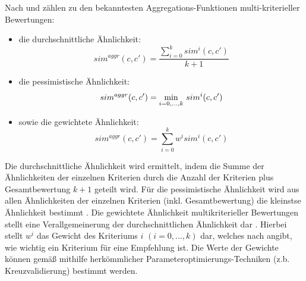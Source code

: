 Nach \textcite[S. 427]{recommenderSystems:2016} und \textcite[S. 857]{adomavicius:4:inbook} zählen zu den bekanntesten Aggregations-Funktionen multi-kriterieller Bewertungen:
\begin{itemize}
    \item die durchschnittliche Ähnlichkeit:
    \begin{equation}\label{eq15}
        sim^{aggr}(c,c') = \frac{\sum\limits_{i=0}^{k}sim^{i}(c,c')}{k+1}
    \end{equation}
    \item die pessimistische Ähnlichkeit:
    \begin{equation}\label{eq16}
        sim^{aggr}(c,c') = \underset{i=0,...,k}{\min}\textnormal{ }sim^{i}(c,c')
    \end{equation}
    \item sowie die gewichtete Ähnlichkeit:
    \begin{equation}\label{eq17}
        sim^{aggr}(c,c') = \sum\limits_{i=0}^{k}w^{i}sim^{i}(c,c')
    \end{equation}
\end{itemize}

Die durchschnittliche Ähnlichkeit wird ermittelt, indem die Summe der Ähnlichkeiten der einzelnen Kriterien durch die Anzahl der Kriterien plus Gesamtbewertung $k+1$ geteilt wird.
Für die pessimistische Ähnlichkeit wird aus allen Ähnlichkeiten der einzelnen Kriterien (inkl. Gesamtbewertung) die kleinstse Ähnlichkeit bestimmt \cite[S. 427]{recommenderSystems:2016}.
Die gewichtete Ähnlichkeit multikriterieller Bewertungen \cite[Kapitel 6.1 The Algorithm, Abs. 1ff.]{tang:article} stellt eine Verallgemeinerung der durchschnittlichen Ähnlichkeit dar \cite[S. 427]{recommenderSystems:2016}.
Hierbei stellt $w^{i}$ das Gewicht des Kriteriums $i$ $(i=0,...,k)$ dar, welches nach \textcite[S. 857]{adomavicius:4:inbook} angibt, wie wichtig ein Kriterium für eine Empfehlung ist.
Die Werte der Gewichte können gemäß \textcite[S. 428]{recommenderSystems:2016} mithilfe herkömmlicher Parameteroptimierungs-Techniken (z.b. Kreuzvalidierung) bestimmt werden.

